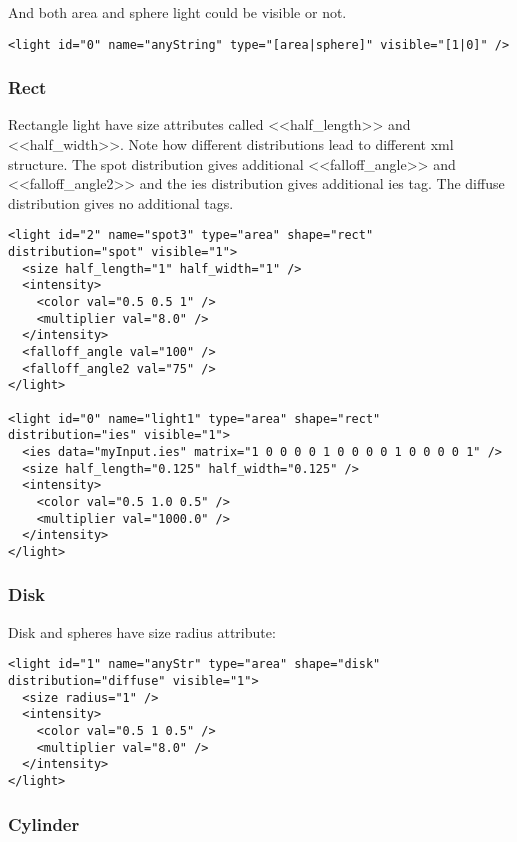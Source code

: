\documentclass[a4paper,11pt]{report}
\begin{document}
And both area and sphere light could be visible or not.
\lstset{language=XML}
\begin{lstlisting}
<light id="0" name="anyString" type="[area|sphere]" visible="[1|0]" />
\end{lstlisting}


\subsubsection{Rect}

Rectangle light have size attributes called <<half\_length>> and <<half\_width>>. Note how different distributions lead to different xml structure. The spot distribution gives additional <<falloff\_angle>> and <<falloff\_angle2>> and the ies distribution gives additional ies tag. The diffuse distribution gives no additional tags. 

\lstset{language=XML}
\begin{lstlisting}
<light id="2" name="spot3" type="area" shape="rect" distribution="spot" visible="1">
  <size half_length="1" half_width="1" />
  <intensity>
    <color val="0.5 0.5 1" />
    <multiplier val="8.0" />
  </intensity>
  <falloff_angle val="100" />
  <falloff_angle2 val="75" />
</light>

<light id="0" name="light1" type="area" shape="rect" distribution="ies" visible="1">
  <ies data="myInput.ies" matrix="1 0 0 0 0 1 0 0 0 0 1 0 0 0 0 1" />  
  <size half_length="0.125" half_width="0.125" />
  <intensity>
    <color val="0.5 1.0 0.5" />
    <multiplier val="1000.0" />
  </intensity>
</light>
\end{lstlisting}

\subsubsection{Disk}

Disk and spheres have size radius attribute:

\lstset{language=XML}
\begin{lstlisting}
<light id="1" name="anyStr" type="area" shape="disk" distribution="diffuse" visible="1">
  <size radius="1" />
  <intensity>
    <color val="0.5 1 0.5" />
    <multiplier val="8.0" />
  </intensity>
</light>
\end{lstlisting}

\subsubsection{Cylinder}
\end{document}

